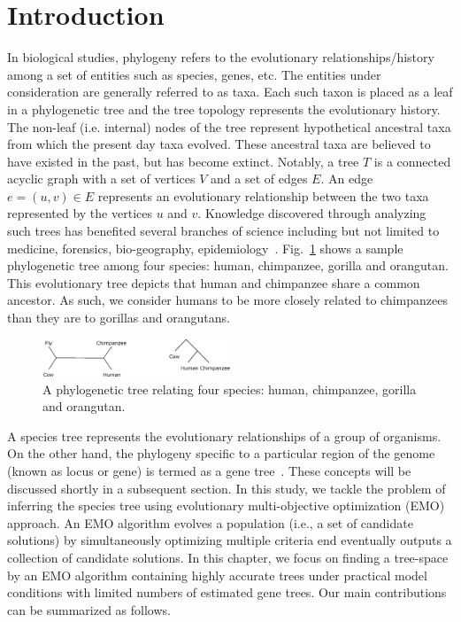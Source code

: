  \section{Introduction}
\label{sec:snoga-intro}
In biological studies, phylogeny refers to the evolutionary relationships/history among a set of entities such as species, genes, etc. The entities under consideration are generally referred to as taxa. Each such taxon is placed as a leaf in a phylogenetic tree and the tree topology represents the evolutionary history. The non-leaf (i.e. internal) nodes of the tree represent hypothetical ancestral taxa from which the present day taxa evolved. These ancestral taxa are believed to have existed in the past, but has become extinct. Notably, a tree $T$ is a connected acyclic graph with a set of vertices $V$ and a set of edges $E$. An edge $e = (u, v) \in E$ represents an evolutionary relationship between the two taxa represented by the vertices $u$ and $v$. Knowledge discovered through analyzing such trees has benefited several branches of science including but not limited to medicine, forensics, bio-geography, epidemiology~\cite{felix2015phylogenetics}. 
Fig.~\ref{fig:outgroup2} shows a sample phylogenetic tree among four species: human, chimpanzee, gorilla and orangutan. This evolutionary tree depicts that human and chimpanzee share a common ancestor. As such, we consider humans to be more closely related to chimpanzees than they are to gorillas and orangutans.

\begin{figure}[!tb]
	\centering
	\includegraphics[width=0.5\textwidth]{Figure/outgroup.eps}
	\caption{A phylogenetic tree relating four species: human, chimpanzee, gorilla and orangutan. }
	\label{fig:outgroup2}
\end{figure}




A species tree represents the evolutionary relationships of a group of organisms. On the other hand, the phylogeny specific to a particular region of the genome (known as locus or gene) is termed as a gene tree~\cite{maddison1997gene}. These concepts will be discussed shortly
in a subsequent section. In this study, we tackle the problem of inferring the species tree using evolutionary multi-objective optimization (EMO) approach. An EMO algorithm evolves a population (i.e., a set of candidate solutions) by simultaneously optimizing multiple criteria end eventually outputs a collection of candidate solutions. In this chapter, we focus on finding a tree-space by an EMO algorithm containing highly accurate trees under practical model conditions with limited numbers of estimated gene trees. Our main contributions can be summarized as follows.

